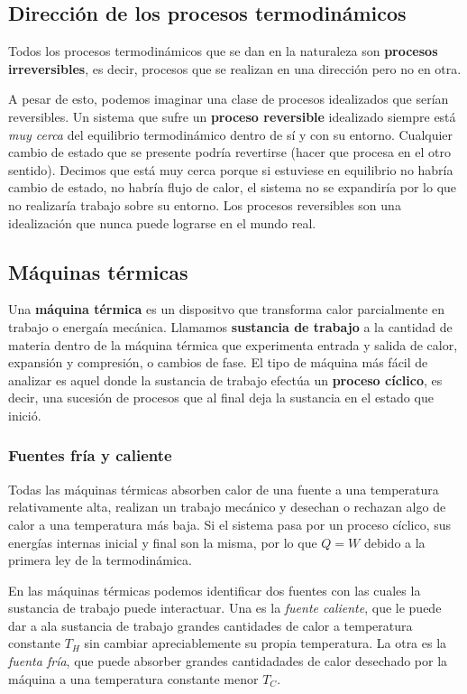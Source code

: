\documentclass[12pt]{article}
\begin{document}
  \subsection{Dirección de los procesos termodinámicos}
  Todos los procesos termodinámicos que se dan en la naturaleza son \textbf{procesos irreversibles}, es decir, procesos que se realizan en una dirección pero no en otra.

  A pesar de esto, podemos imaginar una clase de procesos idealizados que serían reversibles. Un sistema que sufre un \textbf{proceso reversible} idealizado siempre está \textit{muy cerca} del equilibrio termodinámico dentro de sí y con su entorno. Cualquier cambio de estado que se presente podría revertirse (hacer que procesa en el otro sentido). Decimos que está muy cerca porque si estuviese en equilibrio no habría cambio de estado, no habría flujo de calor, el sistema no se expandiría por lo que no realizaría trabajo sobre su entorno. Los procesos reversibles son una idealización que nunca puede lograrse en el mundo real.

  \subsection{Máquinas térmicas}
  Una \textbf{máquina térmica} es un dispositvo que transforma calor parcialmente en trabajo o energaía mecánica. Llamamos \textbf{sustancia de trabajo} a la cantidad de materia dentro de la máquina térmica que experimenta entrada y salida de calor, expansión y compresión, o cambios de fase. El tipo de máquina más fácil de analizar es aquel donde la sustancia de trabajo efectúa un \textbf{proceso cíclico}, es decir, una sucesión de procesos que al final deja la sustancia en el estado que inició.

  \subsubsection{Fuentes fría y caliente}
  Todas las máquinas térmicas absorben calor de una fuente a una temperatura relativamente alta, realizan un trabajo mecánico y desechan o rechazan algo de calor a una temperatura más baja. Si el sistema pasa por un proceso cíclico, sus energías internas inicial y final son la misma, por lo que $ Q = W $ debido a la primera ley de la termodinámica.

  En las máquinas térmicas podemos identificar dos fuentes con las cuales la sustancia de trabajo puede interactuar. Una es la \textit{fuente caliente}, que le puede dar a ala sustancia de trabajo grandes cantidades de calor a temperatura constante $ T_{H} $ sin cambiar apreciablemente su propia temperatura. La otra es la \textit{fuenta fría}, que puede absorber grandes cantidadades de calor desechado por la máquina a una temperatura constante menor $ T_{C} $.
\end{document}
